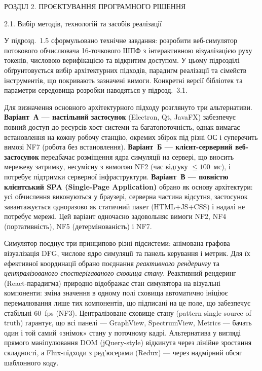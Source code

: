 
\protect{}\label{_Toc228121443}{}РОЗДІЛ 2. ПРОЄКТУВАННЯ
ПРОГРАМНОГО РІШЕННЯ

\protect{}\label{_Toc228121444}{}2.1. Вибір методів,
технологій та засобів реалізації

У підрозд.~1.5 сформульовано технічне завдання: розробити веб-симулятор
потокового обчислювача 16-точкового ШПФ з інтерактивною візуалізацією
руху токенів, числовою верифікацією та відкритим доступом. У цьому
підрозділі обґрунтовується вибір архітектурних підходів, парадигм
реалізації та сімейств інструментів, що покривають зазначені вимоги.
Конкретні версії бібліотек та параметри середовища розробки наводяться
у підрозд.~3.1.

Для визначення основного архітектурного підходу розглянуто три
альтернативи. \textbf{Варіант~А --- настільний застосунок} (Electron,
Qt, JavaFX) забезпечує повний доступ до ресурсів хост-системи та
багатопоточність, однак вимагає встановлення на кожну робочу станцію,
окремих збірок під різні ОС і суперечить вимозі NF7 (робота без
встановлення). \textbf{Варіант~Б --- клієнт-серверний веб-застосунок}
передбачає розміщення ядра симуляції на сервері, що вносить мережеву
затримку, несумісну з вимогою NF2 (час відгуку \(\leq 100\)~мс), і
потребує підтримки серверної інфраструктури. \textbf{Варіант~В ---
повністю клієнтський SPA (Single-Page Application)} обрано як основу
архітектури: усі обчислення виконуються у браузері, серверна частина
відсутня, застосунок завантажується одноразово як статичний пакет
(HTML+JS+CSS) і надалі не потребує мережі. Цей варіант одночасно
задовольняє вимоги NF2, NF4 (портативність), NF5 (детермінованість) і
NF7.

Симулятор поєднує три принципово різні підсистеми: анімована графова
візуалізація DFG, числове ядро симуляції та панель керування і метрик.
Для їх ефективної координації обрано поєднання \emph{реактивного
рендерингу} та \emph{централізованого спостерігаваного сховища стану}.
Реактивний рендеринг (React-парадигма) природно відображає стан
симулятора на візуальні компоненти: зміна значення в одному полі сховища
автоматично ініціює перемалювання лише тих компонентів, що підписані на
це поле, що забезпечує стабільні 60~fps (NF3). Централізоване сховище
стану (pattern single source of truth) гарантує, що всі панелі ---
GraphView, SpectrumView, Metrics --- бачать один і той самий «знімок»
стану у поточному кадрі. Альтернатива у вигляді прямого маніпулювання
DOM (jQuery-style) відкинута через лінійне зростання складності, а
Flux-підходи з ред'юсерами (Redux) --- через надмірний обсяг
шаблонного коду.

